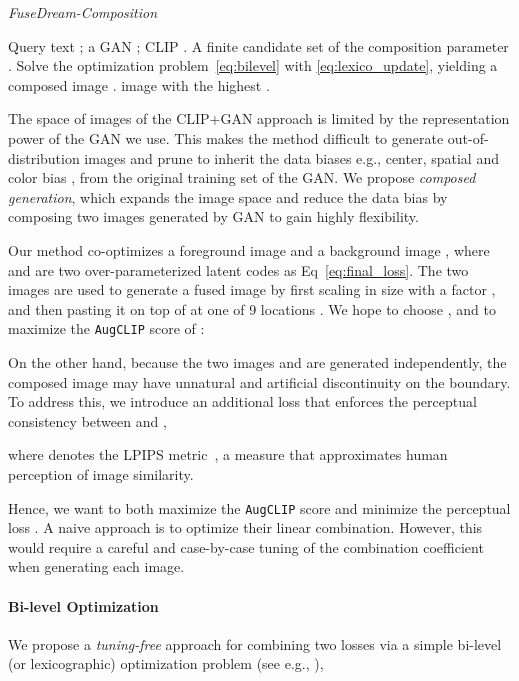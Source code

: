 \documentclass[10pt,twocolumn,letterpaper]{article}
\newcommand{\our}{\emph{FuseDream}}
\newcommand{\ganclip}{CLIP+GAN}
\newcommand{\ourloss}{\texttt{AugCLIP}}
\newcommand{\ourcomp}{\our\emph{-Composition}}
\begin{document}
\begin{algorithm}[t]
\caption{{\ourcomp}}
\label{alg:fuse}
\begin{algorithmic}[1]
\STATE {} Query text ; 
a GAN ; CLIP . 
A finite candidate set  
of the composition parameter . 
\STATE Solve the optimization problem~\eqref{eq:bilevel} with \eqref{eq:lexico_update}, yielding a composed image   .
\ENDFOR
\RETURN image  with the highest .
\end{algorithmic}
\end{algorithm}

The space of images of the {\ganclip} approach is limited by the representation power of the GAN we use. 
This makes the method difficult to generate out-of-distribution images and 
prune to inherit the data biases 
 e.g., center, spatial and color bias \cite{anirudh2019mimicgan, huh2020transforming}, 
 from the original training set of the GAN. 
We propose \emph{composed generation}, 
which expands the image space and reduce the data bias by composing two images generated by GAN to gain highly flexibility.  


Our method co-optimizes a 
foreground image  and a
background image ,
where  and  are two over-parameterized latent codes as Eq~\ref{eq:final_loss}. 
The two images are used to generate a fused image 
 by first scaling  in size with a factor , and then pasting it on top of  at one of 9 locations . We hope to choose , and 
to maximize the {\ourloss} score of : 

On the other hand, 
because the two images  and  
are generated independently,
the composed image may have unnatural and  artificial discontinuity on the boundary. To address this, we introduce an additional loss that enforces the perceptual consistency between  and ,

where  denotes the LPIPS metric~\cite{zhang2018unreasonable}, 
a measure 
that approximates human perception of image similarity. 





Hence, we want to both maximize  the {\ourloss} score and minimize the perceptual loss . 
A naive approach is to optimize their linear combination. 
However, this would require a careful and case-by-case tuning of the combination coefficient when generating each image. 


\paragraph{Bi-level Optimization}
We propose a  
\emph{tuning-free} approach for combining two losses via 
a simple bi-level (or lexicographic) optimization problem (see e.g., \cite{dempe2020bilevel,gong2021biobjective}), 
\end{document}
